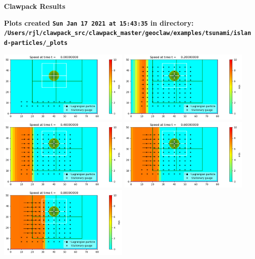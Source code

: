 \documentclass[11pt]{article}
\begin{document}
        \begin{center}{\Large\bf Clawpack Results}\vskip 5pt
        
        \bf Plots created {\tt Sun Jan 17 2021 at 15:43:35} in directory: \vskip 5pt
        \verb+/Users/rjl/clawpack_src/clawpack_master/geoclaw/examples/tsunami/island-particles/_plots+
        \end{center}
        \vskip 5pt
        \includegraphics[width=0.475\textwidth]{frame0000fig0.png}
\vskip 10pt 
\includegraphics[width=0.475\textwidth]{frame0001fig0.png}
\vskip 10pt 
\includegraphics[width=0.475\textwidth]{frame0002fig0.png}
\vskip 10pt 
\includegraphics[width=0.475\textwidth]{frame0003fig0.png}
\vskip 10pt 
\includegraphics[width=0.475\textwidth]{frame0004fig0.png}
\end{document}
